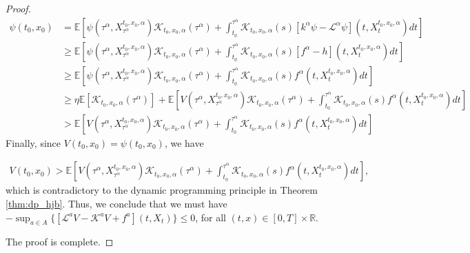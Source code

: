 \documentclass{article}
\begin{document}
\begin{proof}
\begin{equation*}
\begin{aligned}
\psi(t_0,x_0)&=\mathbb{E}\left[\psi(\tau^\alpha,X_{\tau^\alpha}^{t_0,x_0,\alpha})\mathcal{K}_{t_0,x_0,\alpha}(\tau^\alpha)+\int^{\tau^\alpha}_{t_0}\mathcal{K}_{t_0,x_0,\alpha}(s)[k^\alpha\psi-\mathcal{L}^\alpha\psi](t,X_t^{t_0,x_0,\alpha})dt\right]\\
&\geq\mathbb{E}\left[\psi(\tau^\alpha,X_{\tau^\alpha}^{t_0,x_0,\alpha})\mathcal{K}_{t_0,x_0,\alpha}(\tau^\alpha)+\int^{\tau^\alpha}_{t_0}\mathcal{K}_{t_0,x_0,\alpha}(s)[f^\alpha-h](t,X_t^{t_0,x_0,\alpha})dt\right]\\
&\geq\mathbb{E}\left[\psi(\tau^\alpha,X_{\tau^\alpha}^{t_0,x_0,\alpha})\mathcal{K}_{t_0,x_0,\alpha}(\tau^\alpha)+\int^{\tau^\alpha}_{t_0}\mathcal{K}_{t_0,x_0,\alpha}(s)f^\alpha(t,X_t^{t_0,x_0,\alpha})dt\right]\\
&\geq\eta\mathbb{E}[\mathcal{K}_{t_0,x_0,\alpha}(\tau^\alpha)]+\mathbb{E}\left[V(\tau^\alpha,X_{\tau^\alpha}^{t_0,x_0,\alpha})\mathcal{K}_{t_0,x_0,\alpha}(\tau^\alpha)+\int^{\tau^\alpha}_{t_0}\mathcal{K}_{t_0,x_0,\alpha}(s)f^\alpha(t,X_t^{t_0,x_0,\alpha})dt\right]\\
&>\mathbb{E}\left[V(\tau^\alpha,X_{\tau^\alpha}^{t_0,x_0,\alpha})\mathcal{K}_{t_0,x_0,\alpha}(\tau^\alpha)+\int^{\tau^\alpha}_{t_0}\mathcal{K}_{t_0,x_0,\alpha}(s)f^\alpha(t,X_t^{t_0,x_0,\alpha})dt\right]
\end{aligned}
\end{equation*}
Finally, since $V(t_0,x_0)=\psi(t_0,x_0)$, we have

\begin{equation*}
\begin{aligned}
V(t_0,x_0)>\mathbb{E}\left[V(\tau^\alpha,X_{\tau^\alpha}^{t_0,x_0,\alpha})\mathcal{K}_{t_0,x_0,\alpha}(\tau^\alpha)+\int^{\tau^\alpha}_{t_0}\mathcal{K}_{t_0,x_0,\alpha}(s)f^\alpha(t,X_t^{t_0,x_0,\alpha})dt\right],
\end{aligned}
\end{equation*}
which is contradictory to the dynamic programming principle in Theorem \ref{thm:dp_hjb}. Thus, we conclude that we must have $-\sup_{a\in A}\{[\mathcal{L}^aV-\mathcal{K}^aV+f^a](t,X_t)\}\leq0$, for all $(t,x)\in[0,T]\times\mathbb{R}$.

The proof is complete.

\end{proof}
\end{document}
